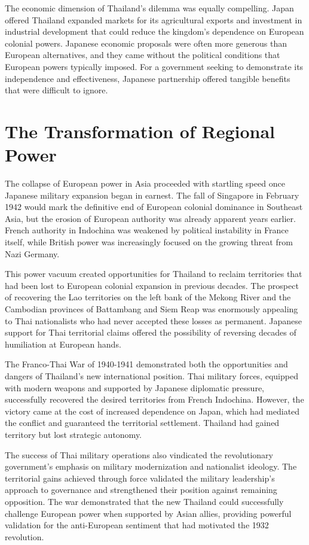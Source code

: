\documentclass[
  Letterpaper,
]{scrbook}
\begin{document}
The economic dimension of Thailand's dilemma was equally compelling.
Japan offered Thailand expanded markets for its agricultural exports and
investment in industrial development that could reduce the kingdom's
dependence on European colonial powers. Japanese economic proposals were
often more generous than European alternatives, and they came without
the political conditions that European powers typically imposed. For a
government seeking to demonstrate its independence and effectiveness,
Japanese partnership offered tangible benefits that were difficult to
ignore.

\section{The Transformation of Regional
Power}\label{the-transformation-of-regional-power}

The collapse of European power in Asia proceeded with startling speed
once Japanese military expansion began in earnest. The fall of Singapore
in February 1942 would mark the definitive end of European colonial
dominance in Southeast Asia, but the erosion of European authority was
already apparent years earlier. French authority in Indochina was
weakened by political instability in France itself, while British power
was increasingly focused on the growing threat from Nazi Germany.

This power vacuum created opportunities for Thailand to reclaim
territories that had been lost to European colonial expansion in
previous decades. The prospect of recovering the Lao territories on the
left bank of the Mekong River and the Cambodian provinces of Battambang
and Siem Reap was enormously appealing to Thai nationalists who had
never accepted these losses as permanent. Japanese support for Thai
territorial claims offered the possibility of reversing decades of
humiliation at European hands.

The Franco-Thai War of 1940-1941 demonstrated both the opportunities and
dangers of Thailand's new international position. Thai military forces,
equipped with modern weapons and supported by Japanese diplomatic
pressure, successfully recovered the desired territories from French
Indochina. However, the victory came at the cost of increased dependence
on Japan, which had mediated the conflict and guaranteed the territorial
settlement. Thailand had gained territory but lost strategic autonomy.

The success of Thai military operations also vindicated the
revolutionary government's emphasis on military modernization and
nationalist ideology. The territorial gains achieved through force
validated the military leadership's approach to governance and
strengthened their position against remaining opposition. The war
demonstrated that the new Thailand could successfully challenge European
power when supported by Asian allies, providing powerful validation for
the anti-European sentiment that had motivated the 1932 revolution.
\end{document}

